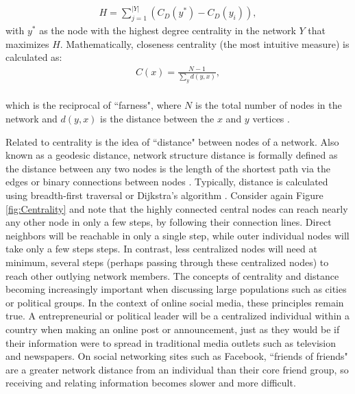 {\begin{equation}\label{eqn:Network Centality_H}
\left.\begin{aligned}
H= \sum_{j=1}^{|Y|}(C_D(y^*)-C_D(y_i)),
\end{aligned}\right.
\end{equation}
\noindent with $y^*$ as the node with the highest degree centrality in the network $Y$ that maximizes $H$.
Mathematically, closeness centrality (the most intuitive measure) is calculated as:
\begin{equation}\label{eqn:Closeness_Centrality}
\left.\begin{aligned}
C(x) = \frac{N-1}{\sum_{y}d(y,x)},
\end{aligned}\right.
\end{equation}\\
\noindent which is the reciprocal of ``farness", where $N$ is the total number of nodes in the network and $d(y,x)$ is the distance between the $x$ and $y$ vertices \cite{bavelas1950communication}.

Related to centrality is the idea of ``distance" between nodes of a network. Also known as a geodesic distance, network structure distance is formally defined as the distance between any two nodes is the length of the shortest path via the edges or binary connections between nodes \cite{bouttier2003geodesic}. 
Typically, distance is calculated using breadth-first traversal \cite{pemmaraju2003computational} or Dijkstra's algorithm \cite{dijkstra1959note}.
Consider again Figure \ref{fig:Centrality} and note that the highly connected central nodes can reach nearly any other node in only a few steps, by following their connection lines. Direct neighbors will be reachable in only a single step, while outer individual nodes will take only a few steps steps. In contrast, less centralized nodes will need at minimum, several steps (perhaps passing through these centralized nodes) to reach other outlying network members. The concepts of centrality and distance becoming increasingly important when discussing large populations such as cities or political groups. In the context of online social media, these principles remain true. A entrepreneurial or political leader will be a centralized individual within a country when making an online post or announcement, just as they would be if their information were to spread in traditional media outlets such as television and newspapers. On social networking sites such as Facebook, ``friends of friends" are a greater network distance from an individual than their core friend group, so receiving and relating information becomes slower and more difficult.

}
